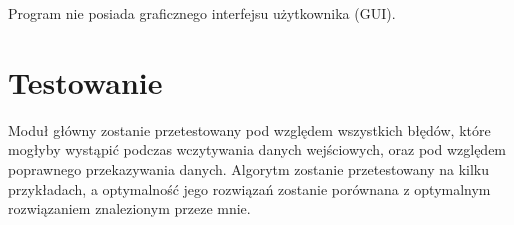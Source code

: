 \documentclass{article}
\begin{document}
Program nie posiada graficznego interfejsu użytkownika (GUI). 

\section{Testowanie}

Moduł główny zostanie przetestowany pod względem wszystkich błędów, które mogłyby wystąpić podczas wczytywania danych wejściowych, oraz pod względem poprawnego przekazywania danych. Algorytm zostanie przetestowany na kilku przykładach, a optymalność jego rozwiązań zostanie porównana z optymalnym rozwiązaniem znalezionym przeze mnie.
\end{document}
